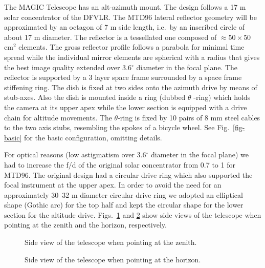 The MAGIC Telescope has an alt-azimuth
mount. The design follows a 17 m solar concentrator of the DFVLR. The MTD96
lateral reflector geometry will be approximated by an octagon of 7 m side
length, i.e.\ by an inscribed circle of about 17 m diameter. The reflector is a
tessellated one composed of $\approx 50\times 50$ cm$^{2}$ elements. The
gross reflector profile follows a parabola for minimal time spread while the
individual mirror elements are spherical with a radius that gives the best
image quality extended over 3.6$^{\circ }$ diameter in the focal plane. The
reflector is supported by a 3 layer space frame surrounded by a space frame
stiffening ring. The dish is fixed at two sides onto the azimuth drive by
means of stub-axes. Also the dish is mounted inside a ring (dubbed $\theta $
-ring) which holds the camera at its upper apex while the lower section is
equipped with a drive chain for altitude movements. The $\theta $-ring is
fixed by 10 pairs of 8 mm steel cables to the two axis stubs, resembling the
spokes of a bicycle wheel. See Fig.~\ref{fig-basic} for the basic configuration,
omitting details.

For optical reasons (low astigmatism over 3.6$^{\circ }$ diameter in the
focal plane) we had to increase the f/d of the original solar concentrator
from 0.7 to 1 for MTD96. The original design had a circular drive ring which
also supported the focal instrument at the upper apex. In order to avoid the
need for an approximately 30--32 m diameter circular drive ring we adopted
an elliptical shape (Gothic arc) for the top half and kept the circular
shape for the lower section for the altitude drive. Figs.~\ref{fig-mero_aufrecht}
and \ref{fig-mero_horizon} show side views of the
telescope when pointing at the zenith and the horizon, respectively.

\begin{figure}[htb]
\leavevmode
\centering
\epsfxsize=9cm
\caption{Side view of the
telescope when pointing at the zenith.}
\label{fig-mero_aufrecht}
\end{figure}

\begin{figure}[htb]
\leavevmode
\centering
\epsfxsize=10cm
\caption{Side view of the
telescope when pointing at the horizon.}
\label{fig-mero_horizon}
\end{figure}


